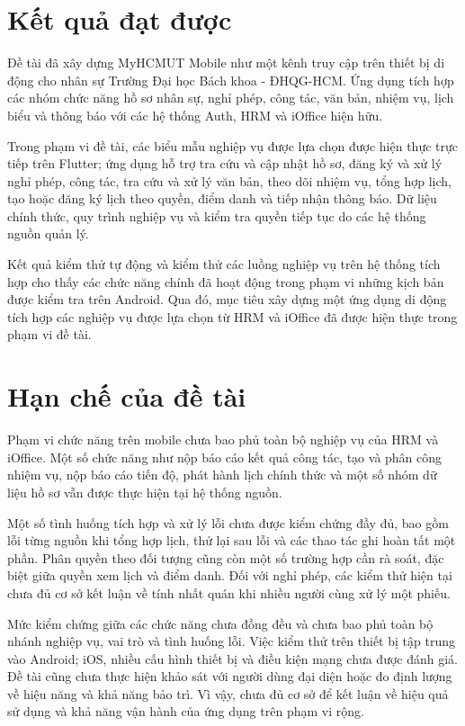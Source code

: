 \section{Kết quả đạt được}
\label{sec:nhanxet_ketqua}

Đề tài đã xây dựng MyHCMUT Mobile như một kênh truy cập trên thiết bị di động cho nhân sự Trường Đại học Bách khoa - ĐHQG-HCM. Ứng dụng tích hợp các nhóm chức năng hồ sơ nhân sự, nghỉ phép, công tác, văn bản, nhiệm vụ, lịch biểu và thông báo với các hệ thống Auth, HRM và iOffice hiện hữu.

Trong phạm vi đề tài, các biểu mẫu nghiệp vụ được lựa chọn được hiện thực trực tiếp trên Flutter; ứng dụng hỗ trợ tra cứu và cập nhật hồ sơ, đăng ký và xử lý nghỉ phép, công tác, tra cứu và xử lý văn bản, theo dõi nhiệm vụ, tổng hợp lịch, tạo hoặc đăng ký lịch theo quyền, điểm danh và tiếp nhận thông báo. Dữ liệu chính thức, quy trình nghiệp vụ và kiểm tra quyền tiếp tục do các hệ thống nguồn quản lý.

Kết quả kiểm thử tự động và kiểm thử các luồng nghiệp vụ trên hệ thống tích hợp cho thấy các chức năng chính đã hoạt động trong phạm vi những kịch bản được kiểm tra trên Android. Qua đó, mục tiêu xây dựng một ứng dụng di động tích hợp các nghiệp vụ được lựa chọn từ HRM và iOffice đã được hiện thực trong phạm vi đề tài.

\section{Hạn chế của đề tài}
\label{sec:hanche}

Phạm vi chức năng trên mobile chưa bao phủ toàn bộ nghiệp vụ của HRM và iOffice. Một số chức năng như nộp báo cáo kết quả công tác, tạo và phân công nhiệm vụ, nộp báo cáo tiến độ, phát hành lịch chính thức và một số nhóm dữ liệu hồ sơ vẫn được thực hiện tại hệ thống nguồn.

Một số tình huống tích hợp và xử lý lỗi chưa được kiểm chứng đầy đủ, bao gồm lỗi từng nguồn khi tổng hợp lịch, thử lại sau lỗi và các thao tác ghi hoàn tất một phần. Phân quyền theo đối tượng cũng còn một số trường hợp cần rà soát, đặc biệt giữa quyền xem lịch và điểm danh. Đối với nghỉ phép, các kiểm thử hiện tại chưa đủ cơ sở kết luận về tính nhất quán khi nhiều người cùng xử lý một phiếu.

Mức kiểm chứng giữa các chức năng chưa đồng đều và chưa bao phủ toàn bộ nhánh nghiệp vụ, vai trò và tình huống lỗi. Việc kiểm thử trên thiết bị tập trung vào Android; iOS, nhiều cấu hình thiết bị và điều kiện mạng chưa được đánh giá. Đề tài cũng chưa thực hiện khảo sát với người dùng đại diện hoặc đo định lượng về hiệu năng và khả năng bảo trì. Vì vậy, chưa đủ cơ sở để kết luận về hiệu quả sử dụng và khả năng vận hành của ứng dụng trên phạm vi rộng.

